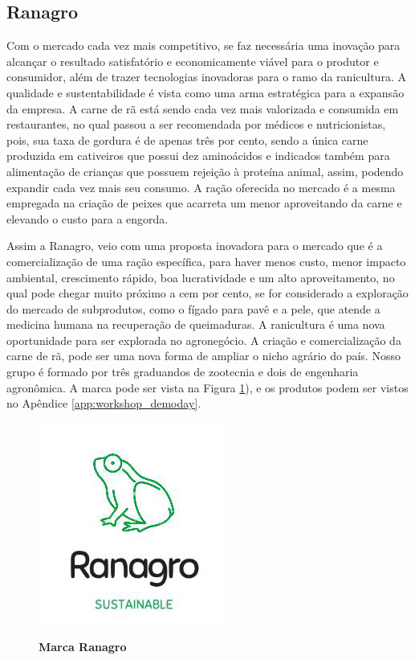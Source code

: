 \subsection{Ranagro}

Com o mercado cada vez mais competitivo, se faz necessária uma inovação para alcançar o resultado satisfatório e economicamente viável para o produtor e consumidor, além de trazer tecnologias inovadoras para o ramo da ranicultura. A qualidade e sustentabilidade é vista como uma arma estratégica para a expansão da empresa. A carne de rã está sendo cada vez mais valorizada e consumida em restaurantes, no qual passou a ser recomendada  por médicos e nutricionistas, pois, sua taxa de gordura é de apenas três por cento, sendo a única carne produzida em cativeiros que possui dez aminoácidos e indicados também para alimentação de crianças que possuem rejeição à proteína animal, assim, podendo expandir cada vez mais seu consumo. A ração oferecida no mercado é a mesma empregada na criação de peixes que acarreta um menor aproveitando da carne e elevando o custo para a engorda.

Assim a Ranagro, veio com uma proposta inovadora para o mercado que é a comercialização de uma ração específica, para haver menos custo, menor impacto ambiental, crescimento rápido, boa lucratividade e um alto aproveitamento, no qual pode chegar muito próximo a cem por cento, se for considerado a exploração do mercado de subprodutos, como o fígado para pavê e a pele, que atende a medicina humana na recuperação de queimaduras. A ranicultura é uma nova oportunidade para ser explorada no agronegócio.  A criação e comercialização da carne de rã, pode ser uma nova forma de ampliar o nicho agrário do país. Nosso grupo é formado por três graduandos de zootecnia e dois de engenharia agronômica. A marca pode ser vista na Figura \ref{figura_26}), e os produtos podem ser vistos no Apêndice \ref{app:workshop_demoday}.



\begin{figure}[H]
\centering
\caption{\textbf{Marca Ranagro}}
\includegraphics[scale=0.7]{Imagens/ranagro.png}
\label{figura_26}
\end{figure}


